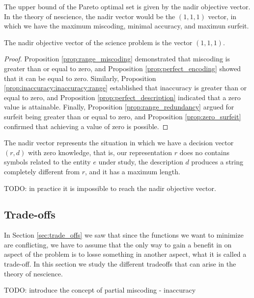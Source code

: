 {\color{red}

The upper bound of the Pareto optimal set is given by the nadir objective vector. In the theory of nescience, the nadir vector would be the $(1, 1, 1)$ vector, in which we have the maximum miscoding, minimal accuracy, and maximun surfeit.

\begin{proposition}
The nadir objective vector of the science problem is the vector $(1, 1, 1)$.
\end{proposition}
\begin{proof}
Proposition \ref{prop:range_miscoding} demonstrated that miscoding is greater than or equal to zero, and Proposition \ref{prop:perfect_encoding} showed that it can be equal to zero. Similarly, Proposition \ref{prop:inaccuracy:inaccuracy:range} established that inaccuracy is greater than or equal to zero, and Proposition \ref{prop:perfect_description} indicated that a zero value is attainable. Finally, Proposition \ref{prop:range_redundancy} argued for surfeit being greater than or equal to zero, and Proposition \ref{prop:zero_surfeit} confirmed that achieving a value of zero is possible.
\end{proof}

The nadir vector represents the situation in which we have a decision vector $(r, d)$ with zero knowledge, that is, our representation $r$ does no contains symbols related to the entity $e$ under study, the description $d$ produces a string completely different from $r$, and it has a maximum length.

\begin{example}
{\color{red} TODO: in practice it is impossible to reach the nadir objective vector.}
\end{example}

}


\subsection*{Trade-offs}

In Section \ref{sec:trade_offs} we saw that since the functions we want to minimize are conflicting, we have to assume that the only way to gain a benefit in on aspect of the problem is to losse something in another aspect, what it is called a trade-off. In this section we study the different tradeoffs that can arise in the theory of nescience.

{\color{red} TODO: introduce the concept of partial miscoding - inaccuracy}

